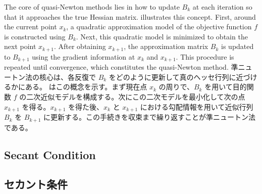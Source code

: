 \documentclass[0_main]{subfiles}
\begin{document}
\ifEn
    The core of quasi-Newton methods lies in how to update $B_k$ at each iteration so that it approaches the true Hessian matrix.
     illustrates this concept. First, around the current point $x_k$, a quadratic approximation model of the objective function $f$ is constructed using $B_k$. Next, this quadratic model is minimized to obtain the next point $x_{k+1}$. After obtaining $x_{k+1}$, the approximation matrix $B_k$ is updated to $B_{k+1}$ using the gradient information at $x_k$ and $x_{k+1}$. This procedure is repeated until convergence, which constitutes the quasi-Newton method.
\else
    準ニュートン法の核心は、各反復で $B_k$ をどのように更新して真のヘッセ行列に近づけるかにある。 はこの概念を示す。まず現在点 $x_k$ の周りで、$B_k$ を用いて目的関数 $f$ の二次近似モデルを構成する。次にこの二次モデルを最小化して次の点 $x_{k+1}$ を得る。$x_{k+1}$ を得た後、$x_k$ と $x_{k+1}$ における勾配情報を用いて近似行列 $B_k$ を $B_{k+1}$ に更新する。この手続きを収束まで繰り返すことが準ニュートン法である。
\fi

\ifEn
    \subsection{Secant Condition}
\else
    \subsection{セカント条件}
\fi
\end{document}
